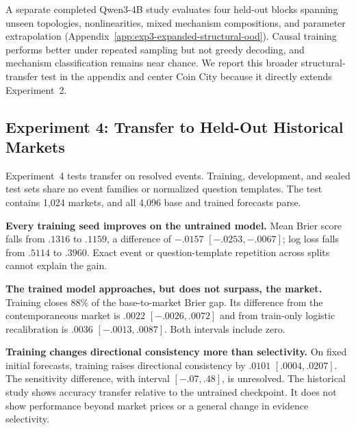 A separate completed Qwen3-4B study evaluates four held-out blocks spanning unseen
topologies, nonlinearities, mixed mechanism compositions, and parameter
extrapolation (Appendix~\ref{app:exp3-expanded-structural-ood}). Causal training
performs better under repeated sampling but not greedy decoding, and mechanism
classification remains near chance. We report this broader structural-transfer
test in the appendix and center Coin City because it directly extends
Experiment~2.

\subsection{Experiment 4: Transfer to Held-Out Historical Markets}
\label{sec:exp4}

Experiment~4 tests transfer on resolved events. Training, development, and sealed
test sets share no event families or normalized question templates. The test
contains 1,024 markets, and all 4,096 base and trained forecasts parse.

\begin{center}
\begin{minipage}{\linewidth}
\centering
{}
\label{tab:exp4-endpoint-results}
\scriptsize
\setlength{\tabcolsep}{3.5pt}
\resizebox{\linewidth}{!}{}
\end{minipage}
\end{center}

\textbf{Every training seed improves on the untrained model.}
Mean Brier score falls from $.1316$ to $.1159$, a difference of $-.0157$
$[-.0253,-.0067]$; log loss falls from $.5114$ to $.3960$. Exact event or
question-template repetition across splits cannot explain the gain.

\textbf{The trained model approaches, but does not surpass, the market.}
Training closes 88\% of the base-to-market Brier gap. Its difference from the
contemporaneous market is $.0022$ $[-.0026,.0072]$ and from train-only logistic
recalibration is $.0036$ $[-.0013,.0087]$. Both intervals include zero.

\textbf{Training changes directional consistency more than selectivity.}
On fixed initial forecasts, training raises directional consistency by $.0101$
$[.0004,.0207]$. The sensitivity difference, with interval $[-.07,.48]$, is
unresolved. The historical study shows accuracy transfer relative to the untrained
checkpoint. It does not show performance beyond market prices or a general change
in evidence selectivity.
